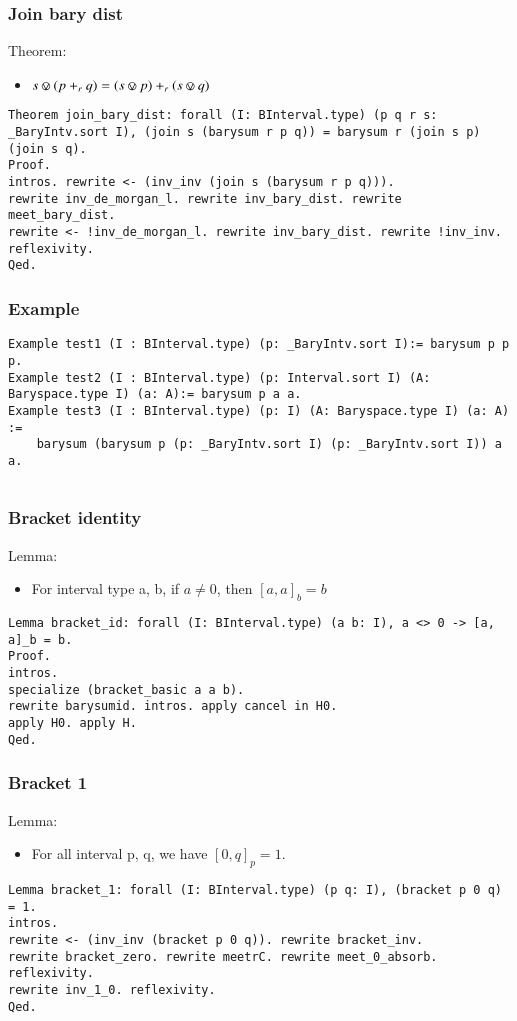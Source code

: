 \documentclass[a4paper,10pt]{article} %
\newcommand{\join}{\circledvee}
\begin{document}
\subsubsection{Join bary dist}
Theorem:
\begin{itemize}
    \item $s \join (p +_rq) = (s \join p) + _r(s \join q)$
\end{itemize}
\begin{lstlisting}
Theorem join_bary_dist: forall (I: BInterval.type) (p q r s: _BaryIntv.sort I), (join s (barysum r p q)) = barysum r (join s p) (join s q).
Proof.
intros. rewrite <- (inv_inv (join s (barysum r p q))). 
rewrite inv_de_morgan_l. rewrite inv_bary_dist. rewrite meet_bary_dist.
rewrite <- !inv_de_morgan_l. rewrite inv_bary_dist. rewrite !inv_inv.
reflexivity.
Qed.
\end{lstlisting}

\subsubsection{Example}
\begin{lstlisting}
Example test1 (I : BInterval.type) (p: _BaryIntv.sort I):= barysum p p p.
Example test2 (I : BInterval.type) (p: Interval.sort I) (A: Baryspace.type I) (a: A):= barysum p a a. 
Example test3 (I : BInterval.type) (p: I) (A: Baryspace.type I) (a: A) := 
    barysum (barysum p (p: _BaryIntv.sort I) (p: _BaryIntv.sort I)) a a.
\end{lstlisting}
\begin{verbatim}

\end{verbatim}

\subsubsection{Bracket identity}
Lemma:
\begin{itemize}
    \item For interval type a, b, if $a \neq 0$, then $[a, a]_b = b$
\end{itemize}
\begin{lstlisting}
Lemma bracket_id: forall (I: BInterval.type) (a b: I), a <> 0 -> [a, a]_b = b.
Proof.
intros. 
specialize (bracket_basic a a b). 
rewrite barysumid. intros. apply cancel in H0. 
apply H0. apply H.
Qed.
\end{lstlisting}

\subsubsection{Bracket 1}
Lemma:
\begin{itemize}
    \item For all interval p, q, we have $[0, q]_p = 1$.
\end{itemize}
\begin{lstlisting}
Lemma bracket_1: forall (I: BInterval.type) (p q: I), (bracket p 0 q) = 1.
intros.
rewrite <- (inv_inv (bracket p 0 q)). rewrite bracket_inv. 
rewrite bracket_zero. rewrite meetrC. rewrite meet_0_absorb.
reflexivity.
rewrite inv_1_0. reflexivity.
Qed.
\end{lstlisting}
\end{document}
